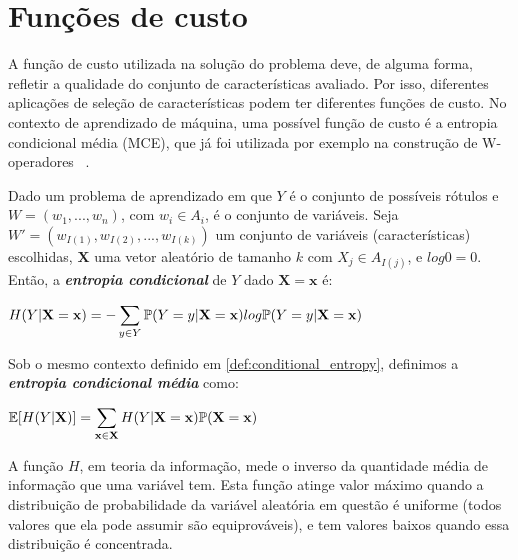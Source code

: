 \section{Funções de custo}
\label{fund_concept:mce} A função de custo utilizada na 
solução do problema deve, de alguma forma, refletir a qualidade do 
conjunto de características avaliado. Por isso,
diferentes aplicações de seleção de características
podem ter diferentes funções de custo. No contexto de aprendizado de 
máquina, uma possível função de custo é a entropia condicional média
(MCE), que já foi utilizada por exemplo na construção de W-operadores
~\cite{MJCJB06}.

\begin{mydefinition}\label{def:conditional_entropy}
Dado um problema de aprendizado em que $Y$ é o conjunto de possíveis
rótulos e $W = (w_1, ..., w_n)$, com $w_i \in A_i$, é o conjunto de
variáveis. Seja $W' = (w_{I(1)}, w_{I(2)}, ..., w_{I(k)})$ um conjunto 
de variáveis (características) escolhidas, $\mathbf{X}$ uma vetor 
aleatório de tamanho $k$ com ${X_j} \in A_{I(j)}$, e $log0 = 0$. Então,
a {\bf \em entropia condicional} de $Y$ dado $\mathbf{X} = \mathbf x$ é:

\begin{center}
$
\begin{aligned}
H (Y | \mathbf{X = x}) = - 
\sum_{y \in Y} \mathbb{P} (Y = y | \mathbf{X = x}) log \mathbb{P} (Y = y | \mathbf{X = x})
\end{aligned}
$
\end{center}
\end{mydefinition}

\begin{mydefinition}
Sob o mesmo contexto definido em \ref{def:conditional_entropy}, 
definimos a {\bf \em entropia condicional média} como:
\begin{center}
$
\begin{aligned}
    \mathbb{E}[H (Y | \mathbf{X})] = 
    \sum_{\mathbf{x} \in \mathbf{X}} H (Y | \mathbf{X = x}) \mathbb{P} (\mathbf{X = x})
\end{aligned}
$
\end{center}
\end{mydefinition}


A função $H$, em teoria da informação, mede o inverso da quantidade 
média de informação que uma variável tem. Esta função atinge valor 
máximo quando a distribuição de probabilidade da variável aleatória em
questão é uniforme (todos valores que ela pode assumir são 
equiprováveis), e tem valores baixos quando essa distribuição é 
concentrada. 

